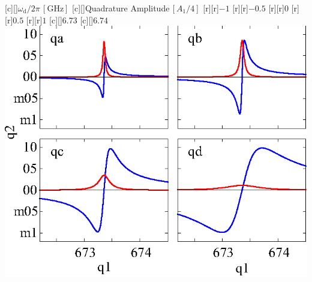 

 [c][]{$\omega_\text{d}/2\pi\,[\text{GHz}]$}
 [c][]{Quadrature Amplitude\,$[A_1/4]$}
 [r][r]{\figsmall$-1$}
 [r][r]{\figsmall$-0.5$}
 [r][r]{\figsmall$0$}
 [r][r]{\figsmall$0.5$}
 [r][r]{\figsmall$1$}
 [c][]{\figsmall$6.73$}
 [c][]{\figsmall$6.74$}
 \includegraphics[height=\bigheight]{quadratures.eps}

